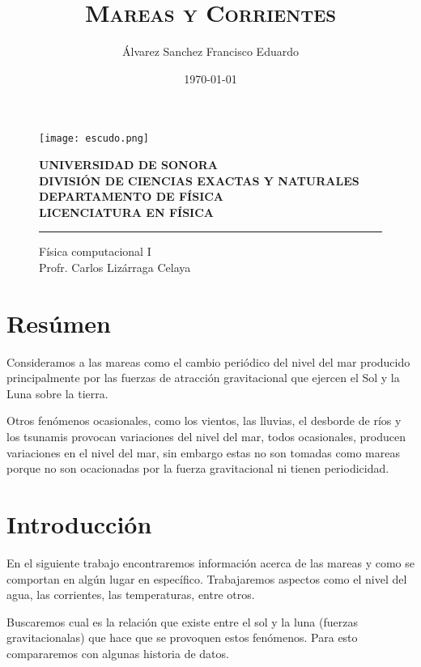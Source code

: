 

\author{Álvarez Sanchez Francisco Eduardo}
\title{\textbf{\textsc{Mareas y Corrientes}}} 
\date{\today}



\begin{titlepage}
	\centering
    \begin{figure}[ht!]
    \centering
    \texttt{[image: escudo.png]}
    
    \textbf{UNIVERSIDAD DE SONORA \\ DIVISIÓN DE CIENCIAS EXACTAS Y NATURALES \\ DEPARTAMENTO DE FÍSICA \\ LICENCIATURA EN FÍSICA}
	\maketitle
    \hrule \bigskip
    \large{Física computacional I}\\
	Profr. Carlos Lizárraga Celaya
    \end{figure}
\thispagestyle{empty}
\end{titlepage}

\newpage

\section{Resúmen}
\noindent Consideramos a las mareas como el cambio periódico del nivel del mar producido principalmente por las fuerzas de atracción gravitacional que ejercen el Sol y la Luna sobre la tierra. 

Otros fenómenos ocasionales, como los vientos, las lluvias, el desborde de ríos y los tsunamis provocan variaciones del nivel del mar, todos ocasionales, producen variaciones en el nivel del mar, sin embargo estas no son tomadas como mareas porque no son ocacionadas por la fuerza gravitacional ni tienen periodicidad. 

\section{Introducción}
 
\noindent En el siguiente trabajo encontraremos información acerca de las mareas y como se comportan en algún lugar en específico. Trabajaremos aspectos como el nivel del agua, las corrientes, las temperaturas, entre otros. 
 
Buscaremos cual es la relación que existe entre el sol y la luna (fuerzas gravitacionalas) que hace que se provoquen estos fenómenos. Para esto compararemos con algunas historia de datos. 


